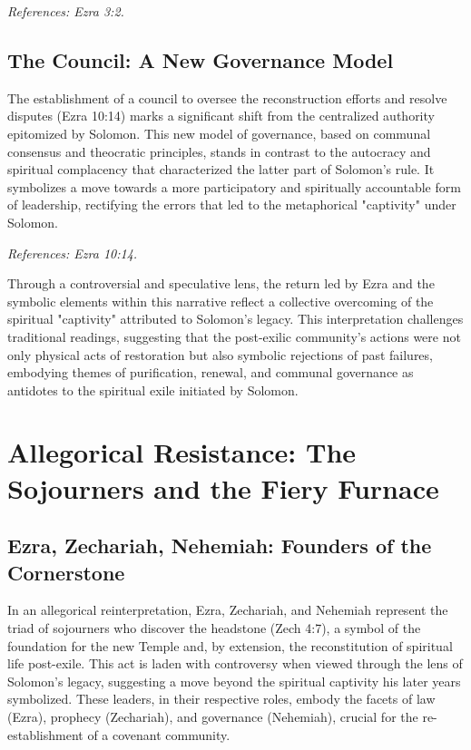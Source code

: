 \textit{References: Ezra 3:2.}

\subsection{The Council: A New Governance Model}

The establishment of a council to oversee the reconstruction efforts and resolve disputes (Ezra 10:14) marks a significant shift from the centralized authority epitomized by Solomon. This new model of governance, based on communal consensus and theocratic principles, stands in contrast to the autocracy and spiritual complacency that characterized the latter part of Solomon's rule. It symbolizes a move towards a more participatory and spiritually accountable form of leadership, rectifying the errors that led to the metaphorical "captivity" under Solomon.

\textit{References: Ezra 10:14.}

Through a controversial and speculative lens, the return led by Ezra and the symbolic elements within this narrative reflect a collective overcoming of the spiritual "captivity" attributed to Solomon's legacy. This interpretation challenges traditional readings, suggesting that the post-exilic community's actions were not only physical acts of restoration but also symbolic rejections of past failures, embodying themes of purification, renewal, and communal governance as antidotes to the spiritual exile initiated by Solomon.

\section{Allegorical Resistance: The Sojourners and the Fiery Furnace}

\subsection{Ezra, Zechariah, Nehemiah: Founders of the Cornerstone}

In an allegorical reinterpretation, Ezra, Zechariah, and Nehemiah represent the triad of sojourners who discover the headstone (Zech 4:7), a symbol of the foundation for the new Temple and, by extension, the reconstitution of spiritual life post-exile. This act is laden with controversy when viewed through the lens of Solomon's legacy, suggesting a move beyond the spiritual captivity his later years symbolized. These leaders, in their respective roles, embody the facets of law (Ezra), prophecy (Zechariah), and governance (Nehemiah), crucial for the re-establishment of a covenant community.

